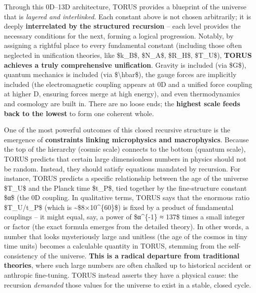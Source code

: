 \documentclass[
]{article}
\begin{document}
Through this 0D--13D architecture, TORUS provides a blueprint of the
universe that is \emph{layered and interlinked}. Each constant above is
not chosen arbitrarily; it is deeply \textbf{interrelated by the
structured recursion} -- each level provides the necessary conditions
for the next, forming a logical progression. Notably, by assigning a
rightful place to every fundamental constant (including those often
neglected in unification theories, like \$k\_B\$, \$N\_A\$, \$R\_H\$,
\$T\_U\$), \textbf{TORUS achieves a truly comprehensive
unification}\hspace{0pt}. Gravity is included (via \$G\$), quantum
mechanics is included (via \$\textbackslash hbar\$), the gauge forces
are implicitly included (the electromagnetic coupling appears at 0D and
a unified force coupling at higher D, ensuring forces merge at high
energy), and even thermodynamics and cosmology are built in. There are
no loose ends; the \textbf{highest scale feeds back to the lowest} to
form one coherent whole\hspace{0pt}.

One of the most powerful outcomes of this closed recursive structure is
the emergence of \textbf{constraints linking microphysics and
macrophysics}. Because the top of the hierarchy (cosmic scale) connects
to the bottom (quantum scale), TORUS predicts that certain large
dimensionless numbers in physics should not be random. Instead, they
should satisfy equations mandated by recursion. For instance, TORUS
predicts a specific relationship between the age of the universe
\$T\_U\$ and the Planck time \$t\_P\$, tied together by the
fine-structure constant \$α\$ (the 0D coupling. In qualitative terms,
TORUS says that the enormous ratio \$T\_U/t\_P\$ (which is
\textasciitilde\$8×10\^{}\{60\}\$) is fixed by a product of fundamental
couplings -- it might equal, say, a power of \$α\^{}\{-1\} ≈ 137\$ times
a small integer or factor (the exact formula emerges from the detailed
theory). In other words, a number that looks mysteriously large and
unitless (the age of the cosmos in tiny time units) becomes a calculable
quantity in TORUS, stemming from the self-consistency of the universe.
\textbf{This is a radical departure from traditional theories}, where
such large numbers are often chalked up to historical accident or
anthropic fine-tuning. TORUS instead asserts they have a physical cause:
the recursion \emph{demanded} those values for the universe to exist in
a stable, closed cycle\hspace{0pt}.
\end{document}
